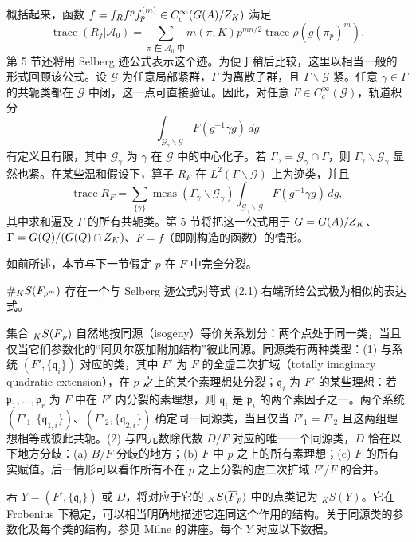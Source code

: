 概括起来，函数 $f=f_R f^pf_p^{(m)}\in C_c^\infty(G(A)/Z_K)$ 满足
\[
 \operatorname{trace}(R_f|\mathcal A_0)
 =\sum_{\pi\text{ 在 }\mathcal A_0\text{ 中}}
 m(\pi,K)p^{mn/2}\operatorname{trace}\rho(g(\pi_p)^m).
\]
第 5 节还将用 Selberg 迹公式表示这个迹。为便于稍后比较，这里以相当一般的形式回顾该公式。设 $\mathcal G$ 为任意局部紧群，$\Gamma$ 为离散子群，且 $\Gamma\backslash\mathcal G$ 紧。任意 $\gamma\in\Gamma$ 的共轭类都在 $\mathcal G$ 中闭，这一点可直接验证。因此，对任意 $F\in C_c^\infty(\mathcal G)$，轨道积分
\[
 \int_{\mathcal G_\gamma\backslash\mathcal G}F(g^{-1}\gamma g)\,dg
\]
有定义且有限，其中 $\mathcal G_\gamma$ 为 $\gamma$ 在 $\mathcal G$ 中的中心化子。若 $\Gamma_\gamma=\mathcal G_\gamma\cap\Gamma$，则 $\Gamma_\gamma\backslash\mathcal G_\gamma$ 显然也紧。在某些温和假设下，算子 $R_F$ 在 $L^2(\Gamma\backslash\mathcal G)$ 上为迹类，并且
\[
 \operatorname{trace}R_F=\sum_{\{\gamma\}}
 \operatorname{meas}(\Gamma_\gamma\backslash\mathcal G_\gamma)
 \int_{\mathcal G_\gamma\backslash\mathcal G}F(g^{-1}\gamma g)\,dg,
\]
其中求和遍及 $\Gamma$ 的所有共轭类。第 5 节将把这一公式用于 $G=G(A)/Z_K$、$\Gamma=G(Q)/(G(Q)\cap Z_K)$、$F=f$（即刚构造的函数）的情形。

如前所述，本节与下一节假定 $p$ 在 $F$ 中完全分裂。

$\#{}_KS(F_{p^m})$ 存在一个与 Selberg 迹公式对等式 (2.1) 右端所给公式极为相似的表达式。

集合 ${}_KS(\overline{F}_p)$ 自然地按同源（isogeny）等价关系划分：两个点处于同一类，当且仅当它们参数化的“阿贝尔簇加附加结构”彼此同源。同源类有两种类型：(1) 与系统 $(F',\{\mathfrak q_i\})$ 对应的类，其中 $F'$ 为 $F$ 的全虚二次扩域（totally imaginary quadratic extension），在 $p$ 之上的某个素理想处分裂；$\mathfrak q_i$ 为 $F'$ 的某些理想：若 $\mathfrak p_1,\ldots,\mathfrak p_r$ 为 $F$ 中在 $F'$ 内分裂的素理想，则 $\mathfrak q_i$ 是 $\mathfrak p_i$ 的两个素因子之一。两个系统 $(F'_1,\{\mathfrak q_{1,i}\})$、$(F'_2,\{\mathfrak q_{2,i}\})$ 确定同一同源类，当且仅当 $F'_1=F'_2$ 且这两组理想相等或彼此共轭。(2) 与四元数除代数 $D/F$ 对应的唯一一个同源类，$D$ 恰在以下地方分歧：(a) $B/F$ 分歧的地方；(b) $F$ 中 $p$ 之上的所有素理想；(c) $F$ 的所有实赋值。后一情形可以看作所有不在 $p$ 之上分裂的虚二次扩域 $F'/F$ 的合并。

若 $Y=(F',\{\mathfrak q_i\})$ 或 $D$，将对应于它的 ${}_KS(\overline{F}_p)$ 中的点类记为 ${}_KS(Y)$。它在 Frobenius 下稳定，可以相当明确地描述它连同这个作用的结构。关于同源类的参数化及每个类的结构，参见 Milne 的讲座。每个 $Y$ 对应以下数据。

